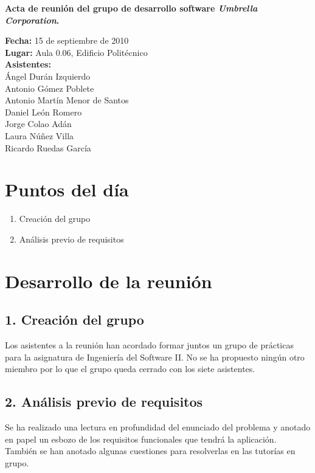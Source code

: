 \documentclass[a4paper,11pt,oneside]{article}
\begin{document}
\pagestyle{fancy}


\begin{center}
{\Large
\textbf{Acta de reunión del grupo de desarrollo software \textit{Umbrella
Corporation}.}
}
\end{center}
\textbf{Fecha:} 15 de septiembre de 2010\\
\textbf{Lugar:} Aula 0.06, Edificio Politécnico\\
\textbf{Asistentes:}\\
\hspace*{1cm}Ángel Durán Izquierdo\\
\hspace*{1cm}Antonio Gómez Poblete\\
\hspace*{1cm}Antonio Martín Menor de Santos\\
\hspace*{1cm}Daniel León Romero\\
\hspace*{1cm}Jorge Colao Adán\\
\hspace*{1cm}Laura Núñez Villa\\
\hspace*{1cm}Ricardo Ruedas García


\section*{Puntos del día}

\begin{enumerate}
\item Creación del grupo
\item Análisis previo de requisitos
\end{enumerate}


\section*{Desarrollo de la reunión}

\subsection*{1. Creación del grupo}

Los asistentes a la reunión han acordado formar juntos un grupo de prácticas
para la asignatura de Ingeniería del Software II. No se ha propuesto ningún
otro miembro por lo que el grupo queda cerrado con los siete asistentes.

\subsection*{2. Análisis previo de requisitos}

Se ha realizado una lectura en profundidad del enunciado del problema y anotado
en papel un esbozo de los requisitos funcionales que tendrá la aplicación.
También se han anotado algunas cuestiones para resolverlas en las tutorías en
grupo.
\end{document}
